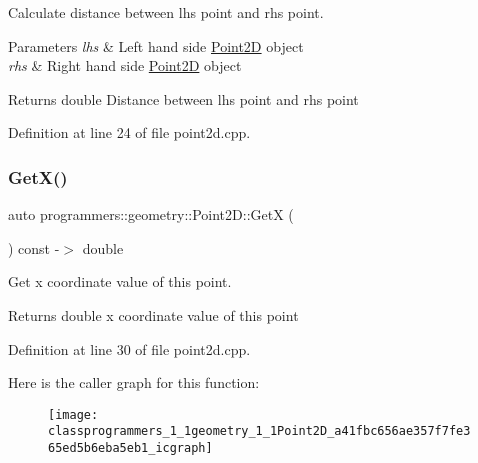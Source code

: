 Calculate distance between lhs point and rhs point. 


\begin{DoxyParams}{Parameters}
{\em lhs} & Left hand side \hyperlink{classprogrammers_1_1geometry_1_1Point2D}{Point2D} object \\
\hline
{\em rhs} & Right hand side \hyperlink{classprogrammers_1_1geometry_1_1Point2D}{Point2D} object \\
\hline
\end{DoxyParams}
\begin{DoxyReturn}{Returns}
double Distance between lhs point and rhs point 
\end{DoxyReturn}


Definition at line 24 of file point2d.\+cpp.

\mbox{\label{classprogrammers_1_1geometry_1_1Point2D_a41fbc656ae357f7fe365ed5b6eba5eb1}} 
\subsubsection{\texorpdfstring{Get\+X()}{GetX()}}
{\footnotesize\ttfamily auto programmers\+::geometry\+::\+Point2\+D\+::\+GetX (\begin{DoxyParamCaption}{ }\end{DoxyParamCaption}) const -\/$>$ double}



Get x coordinate value of this point. 

\begin{DoxyReturn}{Returns}
double x coordinate value of this point 
\end{DoxyReturn}


Definition at line 30 of file point2d.\+cpp.

Here is the caller graph for this function\+:\nopagebreak
\begin{figure}[H]
\begin{center}
\leavevmode
\texttt{[image: classprogrammers\_1\_1geometry\_1\_1Point2D\_a41fbc656ae357f7fe365ed5b6eba5eb1\_icgraph]}
\end{center}
\end{figure}
\mbox{\label{classprogrammers_1_1geometry_1_1Point2D_a28ade425318accb547519a066342dd47}} 
